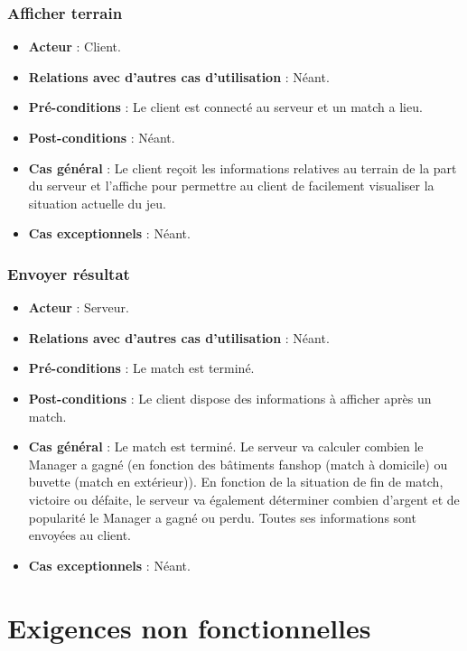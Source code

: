 \documentclass[a4paper,titlepage]{scrreprt}
\begin{document}
    \subsubsection{Afficher terrain}
      \begin{itemize}
        \item \textbf{Acteur}  : Client.
        \item \textbf{Relations avec d'autres cas d'utilisation}  : Néant.
        \item \textbf{Pré-conditions} : Le client est connecté au serveur et un match a lieu.
        \item \textbf{Post-conditions} : Néant.
        \item \textbf{Cas général} : Le client reçoit les informations relatives au terrain de la part du serveur et l’affiche pour permettre au client de facilement visualiser la situation actuelle du jeu.
        \item \textbf{Cas exceptionnels} : Néant. 
      \end{itemize}
    \subsubsection{Envoyer résultat}
      \begin{itemize}
        \item \textbf{Acteur}  : Serveur.
        \item \textbf{Relations avec d'autres cas d'utilisation}  : Néant.
        \item \textbf{Pré-conditions} : Le match est terminé.
        \item \textbf{Post-conditions} : Le client dispose des informations à afficher après un match.
        \item \textbf{Cas général} : Le match est terminé. Le serveur va calculer combien le Manager a gagné (en fonction des bâtiments \gls{fanshop} (match à domicile) ou \gls{buvette} (match en extérieur)). En fonction de la situation de fin de match, victoire ou défaite, le serveur va également déterminer combien d’argent et de popularité le Manager a gagné ou perdu. Toutes ses informations sont envoyées au client.
        \item \textbf{Cas exceptionnels} : Néant.
      \end{itemize}

\section{Exigences non fonctionnelles}
\end{document}
